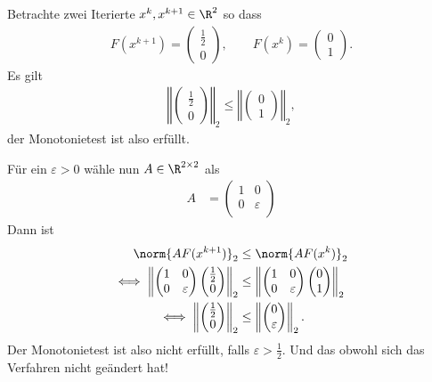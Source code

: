 \begin{bsp}
Betrachte zwei Iterierte $x^k, x^{k+1} \in \R^2$ so dass
\begin{align*}
 F (x^{k+1} )=\begin{pmatrix} \frac{1}{2} \\ 0 \end{pmatrix},
 \qquad
 F (x^k) = \begin{pmatrix} 0 \\ 1 \end{pmatrix}.
\end{align*}
Es gilt
\begin{align*}
 \left\Vert \begin{pmatrix} \frac{1}{2} \\ 0 \end{pmatrix} \right\Vert_2
 \leq
 \left\Vert \begin{pmatrix} 0 \\ 1 \end{pmatrix} \right\Vert_2,
\end{align*}
der Monotonietest ist also erfüllt.

\medskip

Für ein $\varepsilon > 0$ wähle nun $A \in \R^{2 \times 2}$ als
\begin{align*}
 A & =\begin{pmatrix}
       1 & 0 \\ 0 & \varepsilon \\
 \end{pmatrix}
\end{align*}
Dann ist
\begin{align*}
 \norm{ AF (x^{k+1}) }_2
 & \leq
 \norm{ AF (x^k) }_2 \\
				\iff \left\Vert \begin{pmatrix}
					1 & 0 \\ 0 & \varepsilon
				\end{pmatrix} \begin{pmatrix}
					\frac{1}{2} \\ 0
				\end{pmatrix} \right\Vert_2
 & \leq
 \left\Vert \begin{pmatrix}
					1 & 0 \\ 0 & \varepsilon
				\end{pmatrix} \begin{pmatrix}
					0 \\ 1
				\end{pmatrix} \right\Vert_2 \\
				\iff \left\Vert \begin{pmatrix}
					\frac{1}{2} \\ 0 \\
				\end{pmatrix} \right\Vert_2
 & \leq
 \left\Vert \begin{pmatrix}
					0 \\ \varepsilon \\
 \end{pmatrix} \right\Vert_2.
			\end{align*}
Der Monotonietest ist also nicht erfüllt, falls $\varepsilon > \frac{1}{2}$.
Und das obwohl sich das Verfahren nicht geändert hat!
\end{bsp}

